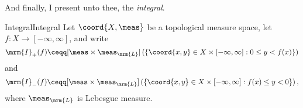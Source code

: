 And finally, I present unto thee, the \emph{integral}.
\begin{dfn}{Integral}{Integral}
Let $\coord{X,\meas}$ be a topological measure space, let $f\colon X\rightarrow [-\infty ,\infty ]$, and write
{\scriptsize
\begin{equation}\label{eqn5.2.173}
\mrm{I}_+(f)\ceqq [\meas \times \meas _{\mrm{L}}]\left( \left\{ \coord{x,y}\in X\times [-\infty ,\infty ]:0\leq y<f(x)\right\} \right)
\end{equation}
}
and
{\scriptsize
\begin{equation}\label{eqn5.2.174}
\mrm{I}_-(f)\ceqq [\meas \times \meas _{\mrm{L}}]\left( \left\{ \coord{x,y}\in X\times [-\infty ,\infty ]:f(x)\leq y<0\right\} \right) ,
\end{equation}
}
where $\meas _{\mrm{L}}$ is Lebesgue measure.


\end{dfn}
